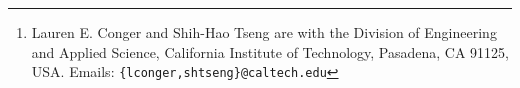 
\author{Lauren E. Conger and Shih-Hao Tseng
\thanks{Lauren E. Conger and Shih-Hao Tseng are with the Division of Engineering and Applied Science, California Institute of Technology, Pasadena, CA 91125, USA.  Emails: {\tt\small \{lconger,shtseng\}@caltech.edu}}
}

\showWriterCommenttrue





